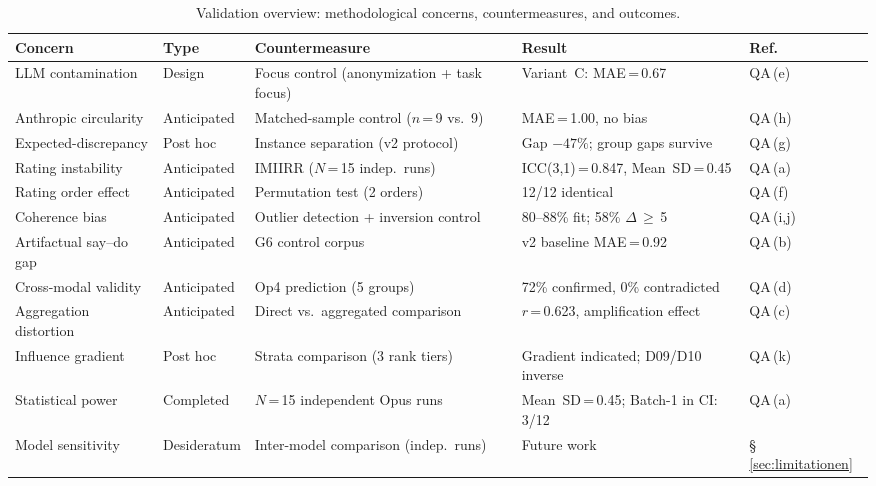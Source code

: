 \documentclass[12pt,a4paper]{article}
\begin{document}
\begin{table}[htbp]
  \centering
  \caption{Validation overview: methodological concerns, countermeasures, and outcomes.}
  \label{tab:validation_overview}
  \scriptsize
  \begin{tabularx}{\textwidth}{@{} L{2.6cm} L{1.8cm} L{2.9cm} Y L{1.1cm} @{}}
    \toprule
    \textbf{Concern} & \textbf{Type} & \textbf{Countermeasure} & \textbf{Result} & \textbf{Ref.} \\
    \midrule
    LLM contamination & Design & Focus control (anonymization + task focus) & Variant~C: MAE\,=\,0.67 & QA\,(e) \\[3pt]
    Anthropic circularity & Anticipated & Matched-sample control ($n$\,=\,9 vs.\ 9) & MAE\,=\,1.00, no bias & QA\,(h) \\[3pt]
    Expected-discrepancy & Post hoc & Instance separation (v2 protocol) & Gap $-47\%$; group gaps survive & QA\,(g) \\[3pt]
    Rating instability & Anticipated & IMIIRR ($N$\,=\,15 indep.\ runs) & ICC(3,1)\,=\,0.847, Mean~SD\,=\,0.45 & QA\,(a) \\[3pt]
    Rating order effect & Anticipated & Permutation test (2 orders) & 12/12 identical & QA\,(f) \\[3pt]
    Coherence bias & Anticipated & Outlier detection + inversion control & 80--88\% fit; 58\% $\Delta$\,$\geq$\,5 & QA\,(i,j) \\[3pt]
    Artifactual say--do gap & Anticipated & G6 control corpus & v2 baseline MAE\,=\,0.92 & QA\,(b) \\[3pt]
    Cross-modal validity & Anticipated & Op4 prediction (5 groups) & 72\% confirmed, 0\% contradicted & QA\,(d) \\[3pt]
    Aggregation distortion & Anticipated & Direct vs.\ aggregated comparison & $r$\,=\,0.623, amplification effect & QA\,(c) \\[3pt]
    Influence gradient & Post hoc & Strata comparison (3 rank tiers) & Gradient indicated; D09/D10 inverse & QA\,(k) \\[3pt]
    Statistical power & Completed & $N$\,=\,15 independent Opus runs & Mean~SD\,=\,0.45; Batch-1 in CI: 3/12 & QA\,(a) \\[3pt]
    Model sensitivity & Desideratum & Inter-model comparison (indep.\ runs) & Future work & \S\,\ref{sec:limitationen} \\
    \bottomrule
  \end{tabularx}
\end{table}
\end{document}

